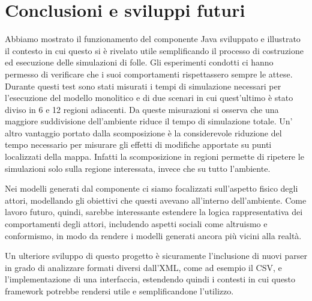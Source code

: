 \chapter{Conclusioni e sviluppi futuri}
Abbiamo mostrato il funzionamento del componente Java sviluppato e illustrato il contesto in cui questo si è rivelato utile semplificando il processo di costruzione ed esecuzione delle simulazioni di folle. Gli esperimenti condotti ci hanno permesso di verificare che i suoi comportamenti rispettassero sempre le attese. Durante questi test sono stati misurati i tempi di simulazione necessari per l'esecuzione del modello monolitico e di due scenari in cui quest'ultimo è stato diviso in 6 e 12 regioni adiacenti. Da queste misurazioni si osserva che una maggiore suddivisione dell'ambiente riduce il tempo di simulazione totale. Un' altro vantaggio portato dalla scomposizione è la considerevole riduzione del tempo necessario per misurare gli effetti di modifiche apportate su punti localizzati della mappa. Infatti la scomposizione in regioni permette di ripetere le simulazioni solo sulla regione interessata, invece che su tutto l'ambiente. 

Nei modelli generati dal componente ci siamo focalizzati sull'aspetto fisico degli attori, modellando gli obiettivi che questi avevano all'interno dell'ambiente. Come lavoro futuro, quindi, sarebbe interessante estendere la logica rappresentativa dei comportamenti degli attori, includendo aspetti sociali come altruismo e conformismo, in modo da rendere i modelli generati ancora più vicini alla realtà. 

Un ulteriore sviluppo di questo progetto è sicuramente l'inclusione di nuovi parser in grado di analizzare formati diversi dall'XML, come ad esempio il CSV, e l'implementazione di una interfaccia, estendendo quindi i contesti in cui questo framework potrebbe rendersi utile e semplificandone l'utilizzo.